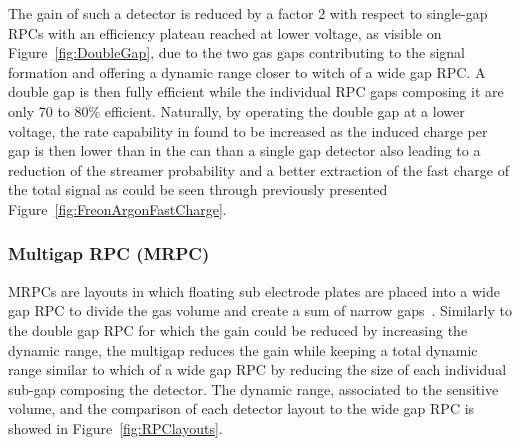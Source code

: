 	The gain of such a detector is reduced by a factor 2 with respect to single-gap RPCs with an efficiency plateau reached at lower voltage, as visible on Figure~\ref{fig:DoubleGap}, due to the two gas gaps contributing to the signal formation and offering a dynamic range closer to witch of a wide gap RPC. A double gap is then fully efficient while the individual RPC gaps composing it are only 70 to 80\% efficient. Naturally, by operating the double gap at a lower voltage, the rate capability in found to be increased as the induced charge per gap is then lower than in the can than a single gap detector also leading to a reduction of the streamer probability and a better extraction of the fast charge of the total signal as could be seen through previously presented Figure~\ref{fig:FreonArgonFastCharge}.
	
		\subsubsection{Multigap RPC (MRPC)}
		\label{chapt4:sssec:MRPC}
	
	MRPCs are layouts in which floating sub electrode plates are placed into a wide gap RPC to divide the gas volume and create a sum of narrow gaps~\cite{ZEBALLOS96MRPC,WILLIAMS98}. Similarly to the double gap RPC for which the gain could be reduced by increasing the dynamic range, the multigap reduces the gain while keeping a total dynamic range similar to which of a wide gap RPC by reducing the size of each individual sub-gap composing the detector. The dynamic range, associated to the sensitive volume, and the comparison of each detector layout to the wide gap RPC is showed in Figure~\ref{fig:RPClayouts}.
	

